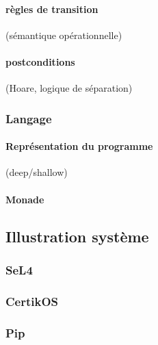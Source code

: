 				\paragraph{règles de transition} (sémantique opérationnelle)

				\paragraph{postconditions} (Hoare, logique de séparation)

			\subsubsection{Langage}

				\paragraph{Représentation du programme} (deep/shallow)

				\paragraph{Monade}

		\subsection{Illustration système}

			\subsubsection{SeL4}
			\subsubsection{CertikOS}
			\subsubsection{Pip}
